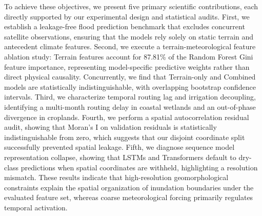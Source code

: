 To achieve these objectives, we present five primary scientific contributions, each directly supported by our experimental design and statistical audits. First, we establish a leakage-free flood prediction benchmark that excludes concurrent satellite observations, ensuring that the models rely solely on static terrain and antecedent climate features. Second, we execute a terrain-meteorological feature ablation study: Terrain features account for 87.81\% of the Random Forest Gini feature importance, representing model-specific predictive weights rather than direct physical causality. Concurrently, we find that Terrain-only and Combined models are statistically indistinguishable, with overlapping bootstrap confidence intervals. Third, we characterize temporal routing lag and irrigation decoupling, identifying a multi-month routing delay in coastal wetlands and an out-of-phase divergence in croplands. Fourth, we perform a spatial autocorrelation residual audit, showing that Moran's I on validation residuals is statistically indistinguishable from zero, which suggests that our disjoint coordinate split successfully prevented spatial leakage. Fifth, we diagnose sequence model representation collapse, showing that LSTMs and Transformers default to dry-class predictions when spatial coordinates are withheld, highlighting a resolution mismatch. These results indicate that high-resolution geomorphological constraints explain the spatial organization of inundation boundaries under the evaluated feature set, whereas coarse meteorological forcing primarily regulates temporal activation.
